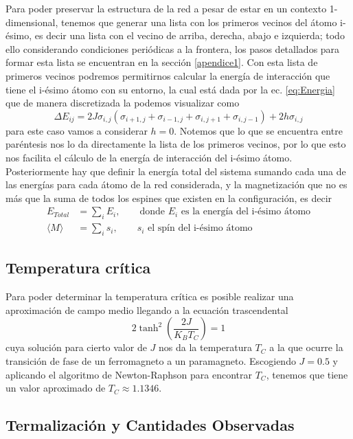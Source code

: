 \documentclass[11pt,a4paper]{article}
\begin{document}
Para poder preservar la estructura de la red a pesar de estar en un contexto 1-dimensional, tenemos que generar una lista con los primeros vecinos del átomo i-ésimo, es decir una lista con el vecino de arriba, derecha, abajo e izquierda; todo ello considerando condiciones periódicas a la frontera, los pasos detallados para formar esta lista se encuentran en la sección \ref{apendice1}. Con esta lista de primeros vecinos podremos permitirnos calcular la energía de interacción que tiene el i-ésimo átomo con su entorno, la cual está dada por la ec. \ref{eq:Energia} que de manera discretizada la podemos visualizar como
\begin{equation}\label{eq:eDiscretizada}
\Delta E_{ij}=2J\sigma_{i,j}(\sigma_{i+1,j}+\sigma_{i-1,j}+\sigma_{i,j+1}+\sigma_{i,j-1})+2h\sigma_{i,j}
\end{equation}
para este caso vamos a considerar $h=0$. Notemos que lo que se encuentra entre paréntesis nos lo da directamente la lista de los primeros vecinos, por lo que esto nos facilita el cálculo de la energía de interacción del i-ésimo átomo. Posteriormente hay que definir la energía total del sistema sumando cada una de las energías para cada átomo de la red considerada, y la magnetización que no es más que la suma de todos los espines que existen en la configuración, es decir
\begin{align*}
E_{Total} &= \sum_i E_i,\qquad\text{donde $E_i$ es la energía del i-ésimo átomo}\\
\langle M\rangle &=\sum_i s_i,\qquad s_i\text{ el spín del i-ésimo átomo}
\end{align*}

\subsection{Temperatura crítica}
Para poder determinar la temperatura crítica es posible realizar una aproximación de campo medio \cite{tong} llegando a la ecuación trascendental
\begin{equation}\label{eq:trasc}
2\tanh^2\left(\frac{2J}{K_BT_C}\right)=1
\end{equation}
cuya solución para cierto valor de $J$ nos da la temperatura $T_C$ a la que ocurre la transición de fase de un ferromagneto a un paramagneto. Escogiendo $J=0.5$ y aplicando el algoritmo de Newton-Raphson para encontrar $T_C$, tenemos que tiene un valor aproximado de $T_C\approx 1.1346$.

\subsection{Termalización y Cantidades Observadas}\label{cantidadesObs}
\end{document}
